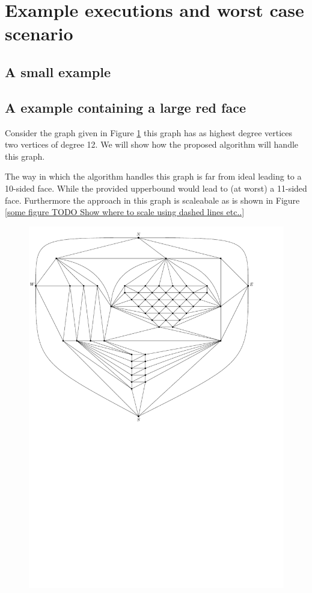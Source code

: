 
\section{Example executions and worst case scenario}
\thispagestyle{plain}

\subsection{A small example}


\subsection{A example containing a large red face}

Consider the graph given in Figure \ref{fig:ex:vert:graph} this graph has as highest degree vertices two vertices of degree 12. We will show how the proposed algorithm will handle this graph.

The way in which the algorithm handles this graph is far from ideal leading to a 10-sided face. While the provided upperbound would lead to (at worst) a 11-sided  face. Furthermore the approach in this graph is scaleabale as is shown in Figure \ref{some figure TODO Show where to scale using dashed lines etc..}

\begin{figure}[h]
  \centering
  \includegraphics[width=\textwidth]{examples/img/vertWorstCase/graph}
  \caption{}
  \label{fig:ex:vert:graph}
\end{figure}

